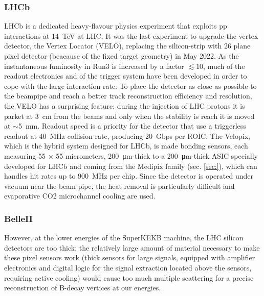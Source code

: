         \subsubsection{LHCb}
        LHCb is a dedicated heavy-flavour physics experiment that exploits pp interactions at \SI{14}{TeV} at LHC. 
        It was the last experiment to upgrade the vertex detector, the Vertex Locator (VELO), replacing the silicon-strip with 26 plane pixel detector (beacause of the fixed target geometry) in May 2022. 
        As the instantaneous luminosity in Run3 is increased by a factor $\lesssim$10, much of the readout electronics and of the trigger system have been developed in order to cope with the large interaction rate.
        To place the detector as close as possible to the beampipe and reach a better track reconstruction efficiency and resolution, the VELO has a surprising feature: during the injection of LHC protons it is parket at \SI{3}{cm} from the beams and only when the stability is reach it is moved at $\sim$\SI{5}{mm}. Readout speed is a priority for the detector that use a triggerless readout at \SI{40}{MHz} collision rate, producing \SI{20}{Gbps} per ROIC. 
        The Velopix, which is the hybrid system designed for LHCb, is made bonding sensors, each measuring 55 $\times$ 55 micrometers, \SI{200}{\um}-thick to a \SI{200}{\um}-thick ASIC specially developed for LHCb and coming from the Medipix family (sec. \ref{sec:}), which can handles hit rates up to \SI{900}{MHz} per chip. 
        Since the detector is operated under vacuum near the beam pipe, the heat removal is particularly difficult and evaporative CO2 microchannel cooling are used. 

    \subsubsection{BelleII}
        However, at the lower energies of the SuperKEKB machine, the LHC silicon detectors are
too thick: the relatively large amount of material necessary to make these pixel sensors work
(thick sensors for large signals, equipped with amplifier electronics and digital logic for the signal
extraction located above the sensors, requiring active cooling) would cause too much multiple
scattering for a precise reconstruction of B-decay vertices at our energies.

